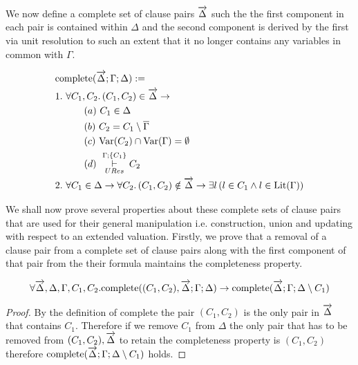 We now define a complete set of clause pairs $\overrightarrow{\Delta}$ such the the first component in each pair is contained within $\Delta$ and the second component is derived by the first via unit resolution to such an extent that it no longer contains any variables in common with $\Gamma$. \\
\medskip
\begin{mydef}
\begin{align*}
 &\mathrm{complete}(\overrightarrow{\Delta};\Gamma; \Delta) :=  \\
& 1. \ \forall C_1,C_2.  \, (C_1, C_2) \in \overrightarrow{\Delta} \to \\
& \hspace{30pt}  (a) \ C_1 \in \Delta \\
& \hspace{30pt}  (b) \ C_2 = C_1 \setminus \overline{\Gamma} \\
& \hspace{30pt}  (c) \ \mathrm{Var}(C_2) \cap \mathrm{Var}(\Gamma) = \emptyset \\
& \hspace{30pt}  (d) \  \overset{\Gamma;\{C_1 \}}{\underset{URes}{\vdash}} C_2 \\
&2. \ \forall C_1 \in \Delta \to \forall C_2. \, (C_1, C_2 ) \notin \overrightarrow{\Delta} \to \exists l \, (l \in C_1 \wedge l \in \mathrm{Lit}(\Gamma))
\end{align*}

\end{mydef}

We shall now prove several properties about these complete sets of clause pairs that are used for their general manipulation i.e. construction, union and updating with respect to an extended valuation. Firstly, we prove that a removal of a clause pair from a complete set of clause pairs along with the first component of that pair from the their formula maintains the completeness property. \\
\medskip
\begin{mylemma}\label{lem:comprem}
\begin{align*}
\forall \overrightarrow{\Delta},\Delta,\Gamma,C_1,C_2. \mathrm{complete}((C_1, C_2), \overrightarrow{\Delta};\Gamma; \Delta) \to \mathrm{complete}(\overrightarrow{\Delta};\Gamma; \Delta \setminus C_1)
\end{align*}
\begin{proof}
By the definition of complete the pair $(C_1, C_2)$ is the only pair in $\overrightarrow{\Delta}$ that contains $C_1$.  Therefore if we remove $C_1$ from $\Delta$ the only pair that has to be removed from $(C_1, C_2), \overrightarrow{\Delta}$ to retain the completeness property is $(C_1,C_2)$ therefore $\mathrm{complete}(\overrightarrow{\Delta};\Gamma; \Delta \setminus C_1)$ holds.
\end{proof}
\end{mylemma}

